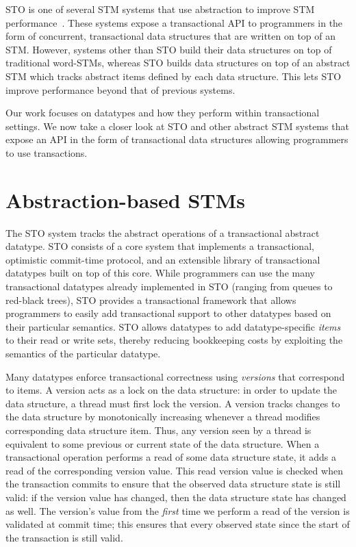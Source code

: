 STO is one of several STM systems that use abstraction to improve STM performance~\cite{predication,autolock, optboost, boost}. These systems expose a transactional API to programmers in the form of concurrent, transactional data structures that are written on top of an STM. However, systems other than STO build their data structures on top of traditional word-STMs, whereas STO builds data structures on top of an abstract STM which tracks abstract items defined by each data structure. This lets STO improve performance beyond that of previous systems. 

Our work focuses on datatypes and how they perform within transactional settings. We now take a closer look at STO and other abstract STM systems that expose an API in the form of transactional data structures allowing programmers to use transactions.

\section{Abstraction-based STMs}

The STO system tracks the abstract operations of a transactional abstract datatype. STO consists of a core system that implements a transactional, optimistic commit-time protocol, and an extensible library of transactional datatypes built on top of this core. While programmers can use the many transactional datatypes already implemented in STO (ranging from queues to red-black trees), STO provides a transactional framework that allows programmers to easily add transactional support to other datatypes based on their particular semantics. STO allows datatypes to add datatype-specific \emph{items} to their read or write sets, thereby reducing bookkeeping costs by 
exploiting the semantics of the particular datatype. 

Many datatypes enforce transactional correctness using \emph{versions} that correspond to items. A version acts as a lock on the data structure: in order to update the data structure, a thread must first lock the version. A version tracks changes to the data structure by monotonically increasing whenever a thread modifies corresponding data structure item. Thus, any version seen by a thread is equivalent to some previous or current state of the data structure. When a transactional operation performs a read of some data structure state, it adds a read of the corresponding version value. This read version value is checked when the transaction commits to ensure that the observed data structure state is still valid: if the version value has changed, then the data structure state has changed as well.
The version's value from the \emph{first} time we perform a read of the version is validated at commit time; this ensures that every observed state since the start of the transaction is still valid.

